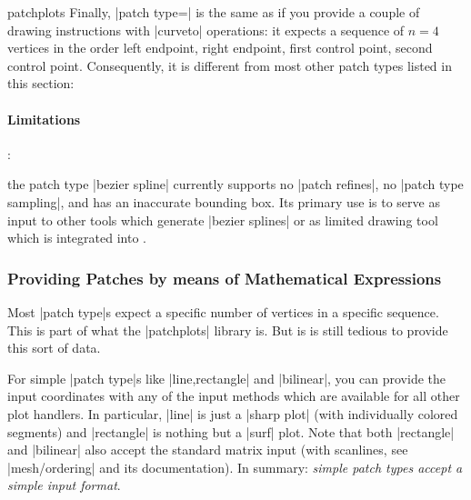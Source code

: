 {\begin{pgfplotslibrary}{patchplots}
Finally, |patch type=| is the same as if you
provide a couple of \Tikz{} drawing instructions with |curveto| operations: it
expects a sequence of $n=4$ vertices in the order left endpoint, right
endpoint, first control point, second control point. Consequently, it is
different from most other patch types listed in this section:

\begin{codeexample}[]
\end{codeexample}


\paragraph{Limitations}:

the patch type |bezier spline| currently supports no |patch refines|, no
|patch type sampling|, and has an inaccurate bounding box. Its primary use is
to serve as input to other tools which generate |bezier splines| or as limited
drawing tool which is integrated into \PGFPlots{}.


\subsubsection{Providing Patches by means of Mathematical Expressions}

Most |patch type|s expect a specific number of vertices in a specific sequence.
This is part of what the |patchplots| library is. But is is still tedious to
provide this sort of data.

For simple |patch type|s like |line,rectangle| and |bilinear|, you can provide
the input coordinates with any of the input methods which are available for all
other plot handlers. In particular, |line| is just a |sharp plot| (with
individually colored segments) and |rectangle| is nothing but a |surf| plot.
Note that both |rectangle| and |bilinear| also accept the standard matrix input
(with scanlines, see |mesh/ordering| and its documentation). In summary:
\emph{simple patch types accept a simple input format}.



\end{pgfplotslibrary}}
